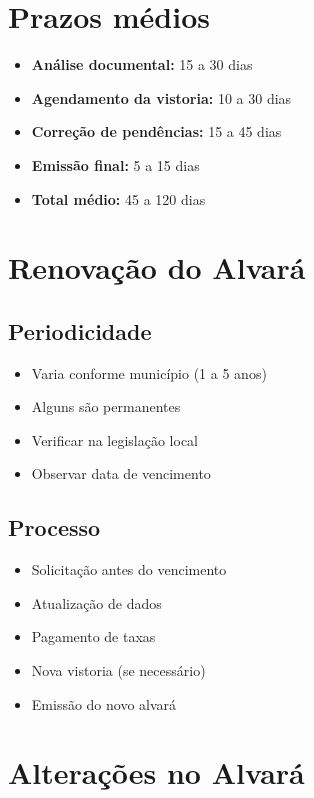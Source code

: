 \documentclass[12pt,a4paper]{article}
\begin{document}
\section{Prazos médios}

\begin{itemize}
    \item \textbf{Análise documental:} 15 a 30 dias
    \item \textbf{Agendamento da vistoria:} 10 a 30 dias
    \item \textbf{Correção de pendências:} 15 a 45 dias
    \item \textbf{Emissão final:} 5 a 15 dias
    \item \textbf{Total médio:} 45 a 120 dias
\end{itemize}

\section{Renovação do Alvará}

\subsection{Periodicidade}
\begin{itemize}
    \item Varia conforme município (1 a 5 anos)
    \item Alguns são permanentes
    \item Verificar na legislação local
    \item Observar data de vencimento
\end{itemize}

\subsection{Processo}
\begin{itemize}
    \item Solicitação antes do vencimento
    \item Atualização de dados
    \item Pagamento de taxas
    \item Nova vistoria (se necessário)
    \item Emissão do novo alvará
\end{itemize}

\section{Alterações no Alvará}
\end{document}
